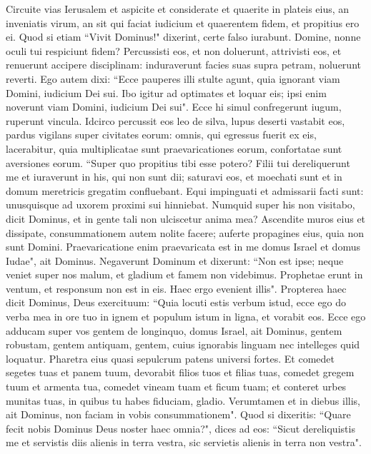 \begin{biblechapter}  
\verse Circuite vias Ierusalem et aspicite et considerate et quaerite in plateis eius, an inveniatis virum, an sit qui faciat iudicium et quaerentem fidem, et propitius ero ei. 
\verse Quod si etiam “Vivit Dominus!" dixerint, certe falso iurabunt. 
\verse Domine, nonne oculi tui respiciunt fidem? Percussisti eos, et non doluerunt, attrivisti eos, et renuerunt accipere disciplinam: induraverunt facies suas supra petram, noluerunt reverti. 
\verse Ego autem dixi: “Ecce pauperes illi stulte agunt, quia ignorant viam Domini, iudicium Dei sui. 
\verse Ibo igitur ad optimates et loquar eis; ipsi enim noverunt viam Domini, iudicium Dei sui". Ecce hi simul confregerunt iugum, ruperunt vincula. 
\verse Idcirco percussit eos leo de silva, lupus deserti vastabit eos, pardus vigilans super civitates eorum: omnis, qui egressus fuerit ex eis, lacerabitur, quia multiplicatae sunt praevaricationes eorum, confortatae sunt aversiones eorum. 
\verse “Super quo propitius tibi esse potero? Filii tui dereliquerunt me et iuraverunt in his, qui non sunt dii; saturavi eos, et moechati sunt et in domum meretricis gregatim confluebant. 
\verse Equi impinguati et admissarii facti sunt: unusquisque ad uxorem proximi sui hinniebat. 
\verse Numquid super his non visitabo, dicit Dominus, et in gente tali non ulciscetur anima mea? 
\verse Ascendite muros eius et dissipate, consummationem autem nolite facere; auferte propagines eius, quia non sunt Domini. 
\verse Praevaricatione enim praevaricata est in me domus Israel et domus Iudae", ait Dominus. 
\verse Negaverunt Dominum et dixerunt: “Non est ipse; neque veniet super nos malum, et gladium et famem non videbimus. 
\verse Prophetae erunt in ventum, et responsum non est in eis. Haec ergo evenient illis". 
\verse Propterea haec dicit Dominus, Deus exercituum: “Quia locuti estis verbum istud, ecce ego do verba mea in ore tuo in ignem et populum istum in ligna, et vorabit eos. 
\verse Ecce ego adducam super vos gentem de longinquo, domus Israel, ait Dominus, gentem robustam, gentem antiquam, gentem, cuius ignorabis linguam nec intelleges quid loquatur. 
\verse Pharetra eius quasi sepulcrum patens universi fortes. 
\verse Et comedet segetes tuas et panem tuum, devorabit filios tuos et filias tuas, comedet gregem tuum et armenta tua, comedet vineam tuam et ficum tuam; et conteret urbes munitas tuas, in quibus tu habes fiduciam, gladio. 
\verse Verumtamen et in diebus illis, ait Dominus, non faciam in vobis consummationem". 
\verse Quod si dixeritis: “Quare fecit nobis Dominus Deus noster haec omnia?", dices ad eos: “Sicut dereliquistis me et servistis diis alienis in terra vestra, sic servietis alienis in terra non vestra". 

\end{biblechapter}
